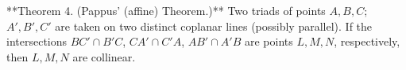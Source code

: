 **Theorem 4. (Pappus' (affine) Theorem.)** Two triads of points $A, B, C$; $A', B', C'$ are taken on two distinct coplanar lines (possibly parallel). If the intersections $BC' \cap B'C$, $CA' \cap C'A$, $AB' \cap A'B$ are points $L, M, N$, respectively, then $L, M, N$ are collinear.
